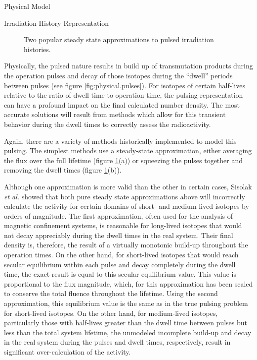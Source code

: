 \begin{chapter}{Physical Model\label{chap:physical}}
\begin{section}{Irradiation History Representation\label{sec:physical.pulsing}}
  \begin{figure}[htbp]
    \begin{center}
         \caption{Two popular steady state approximations to pulsed irradiation histories.}\label{fig:physical.ss_approx}
    \end{center}
  \end{figure}

  Physically, the pulsed nature results in build up of transmutation
  products during the operation pulses and decay of those isotopes
  during the ``dwell'' periods between pulses (see figure
  \ref{fig:physical.pulses}).  For isotopes of certain half-lives
  relative to the ratio of dwell time to operation time, the pulsing
  representation can have a profound impact on the final calculated
  number density.  The most accurate solutions will result from
  methods which allow for this transient behavior during the dwell
  times to correctly assess the radioactivity.
  
  Again, there are a variety of methods historically implemented to
  model this pulsing.  The simplest methods use a steady-state
  approximation, either averaging the flux over the full lifetime
  (figure \ref{fig:physical.ss_approx}(a)) or squeezing the pulses
  together and removing the dwell times (figure
  \ref{fig:physical.ss_approx}(b)).
  
  Although one approximation is more valid than the other in certain
  cases, Sisolak \textsl{et al.}\cite{Pulsar} showed that both pure
  steady state approximations above will incorrectly calculate the
  activity for certain domains of short- and medium-lived isotopes by
  orders of magnitude.  The first approximation, often used for the
  analysis of magnetic confinement systems, is reasonable for
  long-lived isotopes that would not decay appreciably during the
  dwell times in the real system.  Their final density is, therefore,
  the result of a virtually monotonic build-up throughout the
  operation times.  On the other hand, for short-lived isotopes that
  would reach secular equilibrium within each pulse and decay
  completely during the dwell time, the exact result is equal to this
  secular equilibrium value.  This value is proportional to the flux
  magnitude, which, for this approximation has been scaled to conserve
  the total fluence throughout the lifetime.  Using the second
  approximation, this equilibrium value is the same as in the true
  pulsing problem for short-lived isotopes.  On the other hand, for
  medium-lived isotopes, particularly those with half-lives greater
  than the dwell time between pulses but less than the total system
  lifetime, the unmodeled incomplete build-up and decay in the real
  system during the pulses and dwell times, respectively, result in
  significant over-calculation of the activity.
  

\end{section}
\end{chapter}
